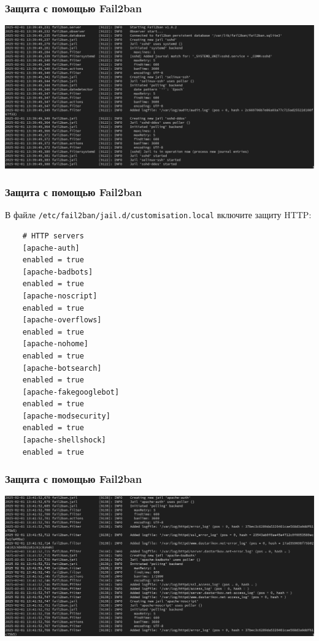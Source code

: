 \begin{frame}
\frametitle{Защита с помощью Fail2ban}
    \centering
    \includegraphics[width=\textwidth]{../images/image03.png}
\end{frame}

\begin{frame}[fragile]
\frametitle{Защита с помощью Fail2ban}
В файле {\tt /etc/fail2ban/jail.d/customisation.local} включите защиту HTTP:
\begin{verbatim}
    # HTTP servers
    [apache-auth]
    enabled = true
    [apache-badbots]
    enabled = true
    [apache-noscript]
    enabled = true
    [apache-overflows]
    enabled = true
    [apache-nohome]
    enabled = true
    [apache-botsearch]
    enabled = true
    [apache-fakegooglebot]
    enabled = true
    [apache-modsecurity]
    enabled = true
    [apache-shellshock]
    enabled = true
\end{verbatim}
\end{frame}

\begin{frame}
\frametitle{Защита с помощью Fail2ban}
    \centering
    \includegraphics[width=\textwidth]{../images/image04.png}
\end{frame}

